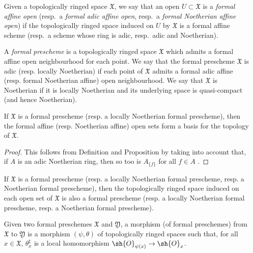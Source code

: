 \begin{env}[10.4.1]
\label{I.10.4.1}
Given a topologically ringed space $\mathfrak{X}$, we say that an open $U\subset\mathfrak{X}$ is a \emph{formal affine open} (resp.~a \emph{formal adic affine open}, resp.~a \emph{formal Noetherian affine open}) if the topologically ringed space induced on $U$ by $\mathfrak{X}$ is a formal affine scheme (resp.~a scheme whose ring is adic, resp.~adic and Noetherian).
\end{env}

\begin{definition}[10.4.2]
\label{I.10.4.2}
A \emph{formal prescheme} is a topologically ringed space $\mathfrak{X}$ which admits a formal affine open neighbourhood for each point.
We say that the formal prescheme $\mathfrak{X}$ is adic (resp. locally Noetherian) if each point of $\mathfrak{X}$ admits a formal adic affine (resp. formal Noetherian affine) open neighbourhood.
We say that $\mathfrak{X}$ is Noetherian if it is locally Noetherian and its underlying space is quasi-compact (and hence Noetherian).
\end{definition}

\begin{proposition}[10.4.3]
\label{I.10.4.3}
If $\mathfrak{X}$ is a formal prescheme (resp. a locally Noetherian formal prescheme), then the formal affine (resp. Noetherian affine) open sets form a basis for the topology of $\mathfrak{X}$.
\end{proposition}

\begin{proof}
This follows from Definition  and Proposition  by taking into account that, if $A$ is an adic Noetherian ring, then so too is $A_{\{f\}}$ for all $f\in A$ .
\end{proof}

\begin{corollary}[10.4.4]
\label{I.10.4.4}
If $\mathfrak{X}$ is a formal prescheme (resp. a locally Noetherian formal prescheme, resp. a Noetherian formal prescheme), then the topologically ringed space induced on each open set of $\mathfrak{X}$ is also a formal prescheme (resp. a locally Noetherian formal prescheme, resp. a Noetherian formal prescheme).
\end{corollary}

\begin{definition}[10.4.5]
\label{I.10.4.5}
Given two formal preschemes $\mathfrak{X}$ and $\mathfrak{Y}$, a morphism (of formal preschemes) from $\mathfrak{X}$ to $\mathfrak{Y}$ is a morphism $(\psi,\theta)$ of topologically ringed spaces such that, for all $x\in\mathfrak{X}$, $\theta_x^\sharp$ is a local homomorphism $\sh{O}_{\psi(x)}\to\sh{O}_x$.
\end{definition}

